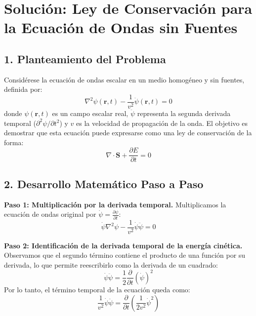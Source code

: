 \documentclass[a4paper]{article}
\begin{document}
\section*{Solución: Ley de Conservación para la Ecuación de Ondas sin Fuentes}

\subsection*{1. Planteamiento del Problema}
Considérese la ecuación de ondas escalar en un medio homogéneo y sin fuentes, definida por:
\begin{equation}
    \nabla^2\psi(\mathbf{r}, t) - \frac{1}{v^2} \ddot{\psi}(\mathbf{r}, t) = 0
\end{equation}
donde $\psi(\mathbf{r}, t)$ es un campo escalar real, $\ddot{\psi}$ representa la segunda derivada temporal ($\partial^2\psi / \partial t^2$) y $v$ es la velocidad de propagación de la onda. El objetivo es demostrar que esta ecuación puede expresarse como una ley de conservación de la forma:
\begin{equation}
    \nabla \cdot \mathbf{S} + \frac{\partial E}{\partial t} = 0
\end{equation}

\subsection*{2. Desarrollo Matemático Paso a Paso}

\textbf{Paso 1: Multiplicación por la derivada temporal.}
Multiplicamos la ecuación de ondas original por $\dot{\psi} = \frac{\partial \psi}{\partial t}$:
\begin{equation}
    \dot{\psi} \nabla^2\psi - \frac{1}{v^2} \dot{\psi} \ddot{\psi} = 0
\end{equation}

\textbf{Paso 2: Identificación de la derivada temporal de la energía cinética.}
Observamos que el segundo término contiene el producto de una función por su derivada, lo que permite reescribirlo como la derivada de un cuadrado:
\begin{equation}
    \dot{\psi} \ddot{\psi} = \frac{1}{2} \frac{\partial}{\partial t} (\dot{\psi})^2
\end{equation}
Por lo tanto, el término temporal de la ecuación queda como:
\begin{equation}
    \frac{1}{v^2} \dot{\psi} \ddot{\psi} = \frac{\partial}{\partial t} \left( \frac{1}{2v^2} \dot{\psi}^2 \right)
\end{equation}
\end{document}
